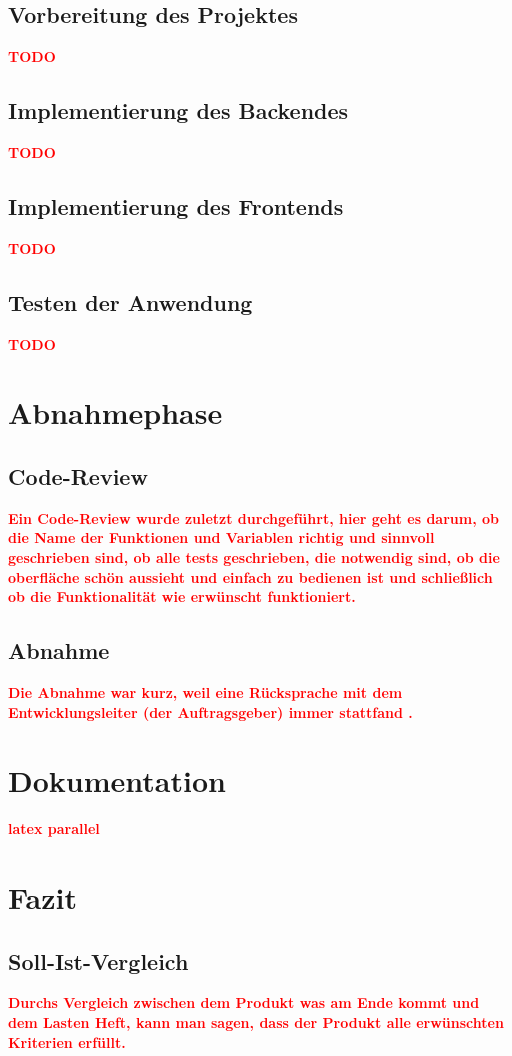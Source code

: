 \begin{flushleft}
\subsection{Vorbereitung des Projektes}
\textcolor{red}{\textbf{TODO}}\\
\subsection{Implementierung des Backendes}
\textcolor{red}{\textbf{TODO}}\\
\subsection{Implementierung des Frontends}
\textcolor{red}{\textbf{TODO}}\\
\subsection{Testen der Anwendung}
\textcolor{red}{\textbf{TODO}}\\
\section{Abnahmephase}
\subsection{Code-Review}
\textcolor{red}{\textbf{Ein Code-Review wurde zuletzt durchgeführt, hier geht es darum, ob die Name der Funktionen und Variablen richtig und sinnvoll geschrieben sind, ob alle tests geschrieben, die notwendig sind, ob die oberfl\"ache sch\"on aussieht und einfach zu bedienen ist und schließlich ob die Funktionalität wie erwünscht funktioniert.}}\\
\subsection{Abnahme}
\textcolor{red}{\textbf{Die Abnahme war kurz, weil eine Rücksprache mit dem Entwicklungsleiter (der Auftragsgeber) immer stattfand .}}\\
\section{Dokumentation}
\textcolor{red}{\textbf{latex parallel}}\\
\section{Fazit}
\subsection{Soll-\/Ist-Vergleich}
\textcolor{red}{\textbf{Durchs Vergleich zwischen dem Produkt was am Ende kommt und dem Lasten Heft, kann man sagen, dass der Produkt alle erwünschten Kriterien erf\"ullt.}}
\\
\end{flushleft}

